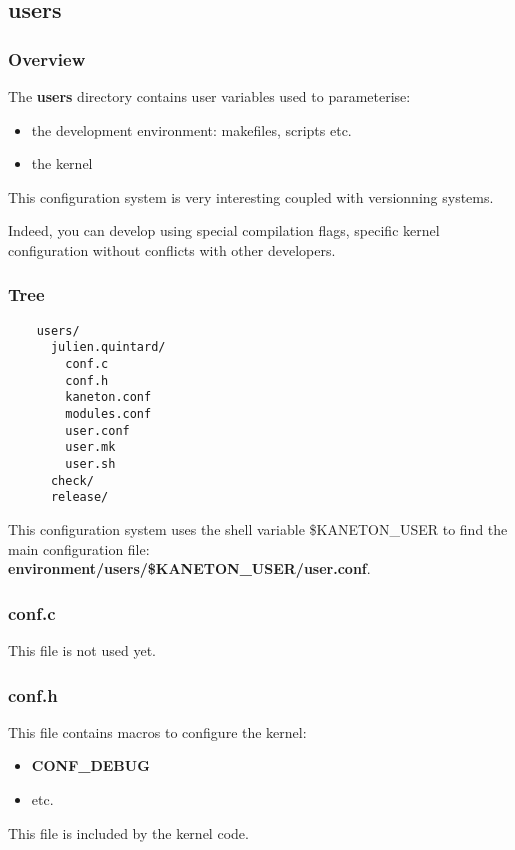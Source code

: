 %
%

\subsection{users}


\begin{frame}
  \frametitle{Overview}

  The \textbf{users} directory contains user variables used to parameterise:

  \begin{itemize}
    \item
      the development environment: makefiles, scripts etc.
    \item
      the kernel
  \end{itemize}

  \nl

  This configuration system is very interesting coupled with versionning
  systems.

  \nl

  Indeed, you can develop using special compilation flags, specific kernel
  configuration without conflicts with other developers.
\end{frame}


\begin{frame}[containsverbatim]
  \frametitle{Tree}

  \begin{verbatim}
    users/
      julien.quintard/
        conf.c
        conf.h
        kaneton.conf
        modules.conf
        user.conf
        user.mk
        user.sh
      check/
      release/
  \end{verbatim}

  This configuration system uses the shell variable \$KANETON\_USER to find
  the main configuration file: \textbf{environment/users/\$KANETON\_USER/user.conf}.
\end{frame}


\begin{frame}
  \frametitle{conf.c}

  This file is not used yet.
\end{frame}


\begin{frame}
  \frametitle{conf.h}

  This file contains macros to configure the kernel:

  \begin{itemize}
    \item
      \textbf{CONF\_DEBUG}
    \item
      etc.
  \end{itemize}

  \nl

  This file is included by the kernel code.
\end{frame}

